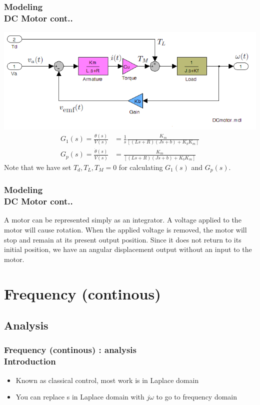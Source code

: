 \documentclass[hyperref={pdfpagelabels=true}]{beamer}
\begin{document}
\begin{frame}
\frametitle{Modeling \\ {\large DC Motor {\tiny cont..}}}
\includegraphics[scale = 0.45]{figs/Selection_023.png}
\begin{align*}
G_1(s)=\frac{\theta(s)}{V(s)}&=\frac{1}{s}\frac{K_m}{[(Ls+R)(Js+b)+K_bK_m]} \\
G_p(s)=\frac{\dot{\theta}(s)}{V(s)} &=\frac{K_m}{[(Ls+R)(Js+b)+K_bK_m]} 
\end{align*}
{\tiny Note that we have set $T_d,T_L,T_M=0$ for calculating $G_1(s)$ and $G_p(s)$.}
\end{frame}

\begin{frame}
\frametitle{Modeling \\ {\large DC Motor {\tiny cont..}}}
A motor can be represented simply as an integrator. A
voltage applied to the motor will cause rotation. When
the applied voltage is removed, the motor will stop and
remain at its present output position. Since it does not
return to its initial position, we have an angular
displacement output without an input to the motor.
\end{frame}


\section{Frequency (continous)}
\subsection{Analysis}

\begin{frame}
\frametitle{Frequency (continous) : analysis\\ {\large Introduction}}
\begin{itemize}
\item Known as classical control, most work is in Laplace
domain
\item You can replace s in Laplace domain with $j\omega$ to go
to frequency domain
\end{itemize}
\beamertemplatenavigationsymbolsempty

\end{frame}
\end{document}
